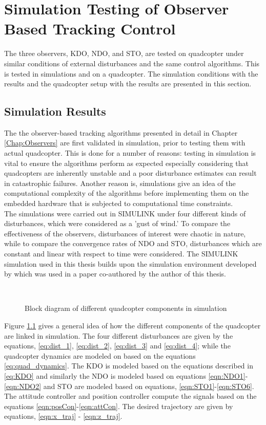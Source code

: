 \documentclass[letterpaper%
, twoside%
, 12pt%
,memoire%
, english%
,creativecommons,hyperref%
]{thETS}
\begin{document}
\chapter{Simulation Testing of Observer Based Tracking Control} \label{Chap:ResultsSim}
The three observers, KDO, NDO, and STO, are tested on quadcopter under similar conditions of external disturbances and the same control algorithms. This is tested in simulations and on a quadcopter. The simulation conditions with the results and the quadcopter setup with the results are presented in this section. 

\section{Simulation Results} \label{section:SimulationResults}
The the observer-based tracking algorithms presented in detail in Chapter \ref{Chap:Observers} are first validated in simulation, prior to testing them with actual quadcopter. This is done for a number of reasons: testing in simulation is vital to ensure the algorithms perform as expected especially considering that quadcopters are inherently unstable and a poor disturbance estimates can result in catastrophic failures. Another reason is, simulations give an idea of the computational complexity of the algorithms before implementing them on the embedded hardware that is subjected to computational time constraints. \\
The simulations were carried out in SIMULINK under four different kinds of disturbances, which were considered as a 'gust of wind.' To compare the effectiveness of the observers, disturbances of interest were chaotic in nature, while to compare the convergence rates of NDO and STO, disturbances which are constant and linear with respect to time were considered. 
The SIMULINK simulation used in this thesis builds upon the simulation environment developed by \citep{nuradeen2019thesis} which was used in a paper co-authored by the author of this thesis. 
\begin{figure}[H]
	\centering
	\resizebox{0.85\textwidth}{!}{\fbox{}}
	 \\ \parbox{0.75\textwidth}{\caption{Block diagram of different quadcopter components in simulation \label{Fig:block_simulation}}}
\end{figure}

Figure \ref{Fig:block_simulation} gives a general idea of how the different components of the quadcopter are linked in simulation. The four different disturbances are given by the equations, \eqref{eq:dist_1}, \eqref{eq:dist_2}, \eqref{eq:dist_3} and \eqref{eq:dist_4}; while the quadcopter dynamics are modeled on based on the equations \eqref{eq:quad_dynamics}. The KDO is modeled based on the equations described in \eqref{eq:KDO} and similarly the NDO is modeled based on equations \eqref{eqn:NDO1}-\eqref{eqn:NDO2} and STO are modeled based on equations, \eqref{eqn:STO1}-\eqref{eqn:STO6}. The attitude controller and position controller compute the signals based on the equations \eqref{eqn:posCon}-\eqref{eqn:attCon}. The desired trajectory are given by equations, \eqref{eqn:x_traj} - \eqref{eqn:z_traj}. 
\end{document}
